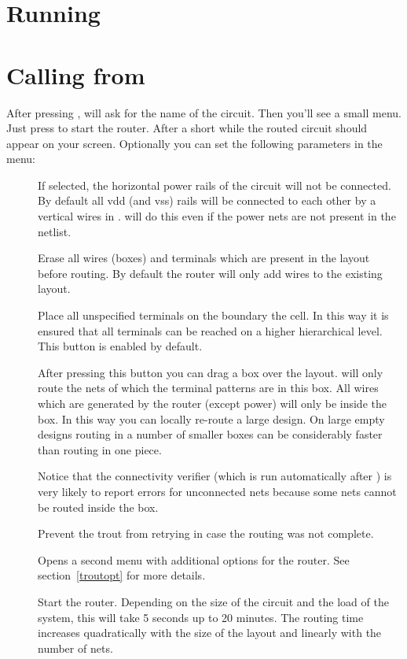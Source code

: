 \section{Running \protect{}}
\section{Calling \protect{} from \protect{}}
After pressing ,  will ask
for the name of the circuit. Then you'll see a small menu.
Just press  to start the router. After a short while
the routed circuit should appear on your screen.
Optionally you can set the following parameters in the
menu:
\begin{description}
\item[]
If selected, the horizontal power rails of the circuit will not be connected.
By default all vdd (and vss) rails will be connected to each other by a
vertical wires in .  will do this even if the power nets
are not present in the netlist.
\item[]
Erase all wires (boxes) and terminals which are present in the layout before
routing. By default the router will only add wires to the existing layout.
\item[]
Place all unspecified terminals on the boundary the cell. In this way it is
ensured that all terminals can be reached on a higher hierarchical level. This
button is enabled by default.
\item[]
After pressing this button you can drag a box over the layout. 
will only route the nets of which the terminal patterns are in this box. All
wires which are generated by the router (except power) will only be inside the
box. In this way you can locally re-route a large design. On large empty
designs routing in a number of smaller boxes can be considerably faster than
routing in one piece.

Notice that the connectivity verifier (which is run
automatically after ) is very likely to report
errors for unconnected nets because some nets cannot be
routed inside the box.
\item[]
Prevent the trout from retrying in case the routing was not complete.
\item[]
Opens a second menu with additional options for the router.
See section~\ref{troutopt} for more details.
\item[]
Start the router. Depending on the size of the circuit and
the load of the system, this will take 5 seconds up to 20
minutes.  The routing time increases quadratically with the
size of the layout and linearly with the number of nets.
\end{description}

